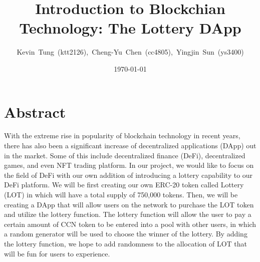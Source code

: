 \documentclass[11pt]{article}
\title{Introduction to Blockchian Technology: The Lottery DApp} %
\author{Kevin~Tung~(ktt2126),~Cheng-Yu~Chen~(cc4805),~Yingjin~Sun~(ys3400)} %
\date{\today} %
\begin{document}
\maketitle
\section*{Abstract}
With the extreme rise in popularity of blockchain technology in recent years, there has also been a significant increase of decentralized applications (DApp) out in the market. Some of this include decentralized finance (DeFi), decentralized games, and even NFT trading platform. In our project, we would like to focus on the field of DeFi with our own addition of introducing a lottery capability to our DeFi platform. We will be first creating our own ERC-20 token called Lottery (LOT) in which will have a total supply of 750,000 tokens. Then, we will be creating a DApp that will allow users on the network to purchase the LOT token and utilize the lottery function. The lottery function will allow the user to pay a certain amount of CCN token to be entered into a pool with other users, in which a random generator will be used to choose the winner of the lottery. By adding the lottery function, we hope to add randomness to the allocation of LOT that will be fun for users to experience.
\end{document}
